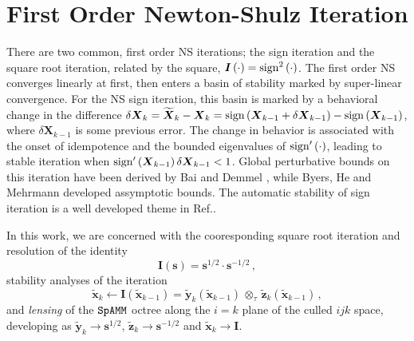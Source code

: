 \documentclass[letterpaper,twocolumn,amsmath,amsfont,amssymb,english,aps,jcp,preprintnumbers,groupaddress,nofootinbib,tightenlines]{revtex4}
\newcommand{\mat}[1]{\boldsymbol{#1}}
\newcommand{\ot}{ {\scriptstyle \otimes}_{ \tau } }
\begin{document}
\section{First Order Newton-Shulz Iteration}

There are two common, first order NS iterations; the sign iteration and the square root iteration, related by the square, $\mat{I}\left( \cdot \right)= {\rm sign}^2\left( \cdot \right) $.  The first order NS converges linearly at first, then enters a basin of stability marked by super-linear convergence.   
For the NS sign iteration, this basin is marked by a behavioral change in the
difference $\delta \mat{X}_k = \widetilde{\mat{X}}_k -\mat{X}_k = {\rm sign} \left(\mat{X}_{k-1}+\delta \mat{X}_{k-1} \right)
-{\rm sign} \left(\mat{X}_{k-1} \right)$, where $\delta \mat{X}_{k-1}$ is some previous error.
The change in behavior is associated with the onset of idempotence and the bounded eigenvalues of ${\rm sign}'\left( \cdot \right)$, leading to stable 
iteration when ${\rm sign}'\left( \mat{X}_{k-1} \right) \delta \mat{X}_{k-1} < 1 $.  
Global perturbative bounds on this iteration have been derived by Bai and Demmel \cite{Bai98usingthe}, while
Byers, He and Mehrmann \cite{} developed assymptotic bounds.  
The automatic stability of sign iteration is a well developed theme in Ref.\cite{Higham08}.

In this work, we are concerned with the cooresponding square root iteration and resolution of the identity \cite{}
\begin{equation}
\mat{I} \left( \mat{s} \right) =\mat{s}^{1/2} \cdot \mat{s}^{-1/2} \, ,
\end{equation}
stability analyses of the iteration 
\begin{equation}
\widetilde{\mat{x}}_k \leftarrow \mat{I} \left( \widetilde{\mat{x}}_{k-1} \right) = \widetilde{\mat{y}}_k \left( \widetilde{\mat{x}}_{k-1} \right)
\, \ot \, \widetilde{\mat{z}}_k \left( \widetilde{\mat{x}}_{k-1} \right) \, ,
\end{equation}
and {\em lensing} of the $\tt SpAMM$ octree along the $i=k$ plane of the culled $ijk$ space,  developing as 
$\widetilde{\mat{y}}_k \rightarrow \mat{s}^{1/2}$, $\widetilde{\mat{z}}_k \rightarrow \mat{s}^{-1/2}$ and 
$\widetilde{\mat{x}}_k \rightarrow {\mat{I}}$.
\end{document}
